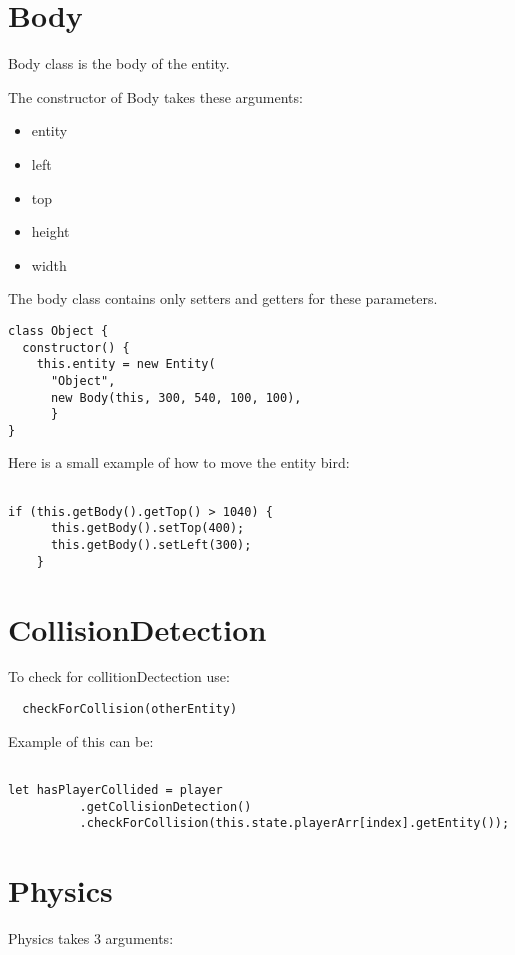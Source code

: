 \section{Body}
Body class is the body of the entity.  

The constructor of Body takes these arguments:

\begin{itemize}
	\item entity
    \item left
    \item top
    \item height
    \item width
\end{itemize}

\newpage
The body class contains only setters and getters for these parameters.

\begin{lstlisting}
class Object {
  constructor() {
    this.entity = new Entity(
      "Object",
      new Body(this, 300, 540, 100, 100),
      }
}
\end{lstlisting}

Here is a small example of how to move the entity bird:
\begin{lstlisting}

if (this.getBody().getTop() > 1040) {
      this.getBody().setTop(400);
      this.getBody().setLeft(300);
    }
\end{lstlisting}

\section{CollisionDetection}
To check for collitionDectection use:
\begin{lstlisting}
  checkForCollision(otherEntity)
\end{lstlisting}

Example of this can be:
\begin{lstlisting}

let hasPlayerCollided = player
          .getCollisionDetection()
          .checkForCollision(this.state.playerArr[index].getEntity());
\end{lstlisting}


\section{Physics}

Physics takes 3 arguments:

